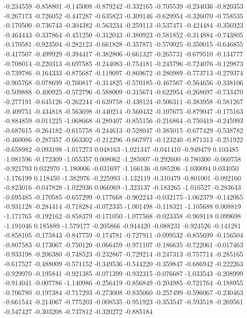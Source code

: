 -0.234559
-0.858801
-0.145008
-0.879242
-0.332165
-0.705539
-0.234036
-0.820353
-0.267173
-0.726052
-0.447287
-0.635823
-0.309146
-0.629954
-0.326070
-0.758535
-0.170500
-0.736743
-0.304382
-0.563234
-0.259113
-0.537471
-0.424484
-0.356923
-0.464443
-0.337864
-0.451250
-0.312043
-0.380923
-0.581852
-0.314884
-0.743805
-0.170581
-0.923504
-0.282123
-0.661828
-0.357871
-0.570025
-0.350015
-0.646855
-0.417507
-0.499929
-0.394417
-0.382806
-0.661327
-0.265731
-0.679510
-0.134777
-0.708014
-0.220313
-0.697585
-0.244083
-0.754181
-0.245796
-0.724076
-0.129873
-0.739786
-0.164333
-0.875687
-0.119097
-0.869672
-0.280989
-0.773713
-0.279374
-0.905768
-0.078699
-0.760817
-0.314825
-0.570185
-0.467567
-0.564656
-0.338106
-0.509888
-0.400925
-0.572796
-0.588009
-0.315674
-0.622954
-0.268697
-0.733470
-0.277191
-0.645126
-0.262244
-0.639758
-0.438124
-0.506311
-0.383958
-0.581267
-0.409751
-0.434818
-0.563698
-0.440214
-0.560432
-0.107675
-0.879047
-0.175163
-0.884859
-0.011225
-1.068668
-0.289407
-0.855156
-0.216864
-0.750419
-0.245993
-0.687615
-0.264182
-0.615758
-0.244613
-0.528047
-0.385015
-0.677429
-0.538782
-0.460086
-0.287357
-0.663302
-0.212296
-0.667971
-0.123240
-0.871313
-0.251922
-0.658982
-0.093198
-1.017273
0.048163
-1.021347
-0.041410
-0.949479
0.103485
-1.081596
-0.172309
-1.055357
0.008062
-1.285007
-0.292600
-0.780300
-0.060758
-0.921793
0.032970
-1.180006
-0.031697
-1.166136
-0.085206
-1.030094
0.034050
-1.176199
0.118450
-1.382976
-0.225993
-1.132119
-0.310479
-0.801001
-0.092160
-0.823016
-0.047828
-1.022936
0.066969
-1.323137
-0.183265
-1.016527
-0.283643
-0.695485
-0.170585
-0.657299
-0.177668
-0.902243
-0.032175
-1.062379
-0.142065
-0.931128
-0.284414
-0.718284
-0.072335
-1.001498
-0.118321
-1.105688
0.008819
-1.171765
-0.192162
-0.858379
-0.171050
-1.077568
-0.023358
-0.969118
0.099698
-1.191046
0.185889
-1.579177
-0.205866
-0.944420
-0.088231
-0.924526
-0.141281
-0.858105
-0.175843
-0.847759
-0.174781
-0.727911
-0.099532
-0.855699
-0.156504
-0.807583
-0.173067
-0.750120
-0.066459
-0.971107
-0.186635
-0.722061
-0.017463
-0.933198
-0.206380
-0.748523
-0.232867
-0.729214
-0.247313
-0.757714
-0.285165
-0.617527
-0.488009
-0.571152
-0.349536
-0.544220
-0.359847
-0.686942
-0.222263
-0.929970
-0.195841
-0.921385
-0.071399
-0.932315
-0.076687
-1.033543
-0.208999
-0.914041
-0.007786
-1.140986
-0.256419
-0.856849
-0.204985
-0.721764
-0.188955
-0.706780
-0.197384
-0.717293
-0.273008
-0.835060
-0.257499
-0.596067
-0.230463
-0.661544
-0.214067
-0.775203
-0.008535
-0.951923
-0.353547
-0.593518
-0.269561
-0.547427
-0.303208
-0.737812
-0.320272
-0.885184
